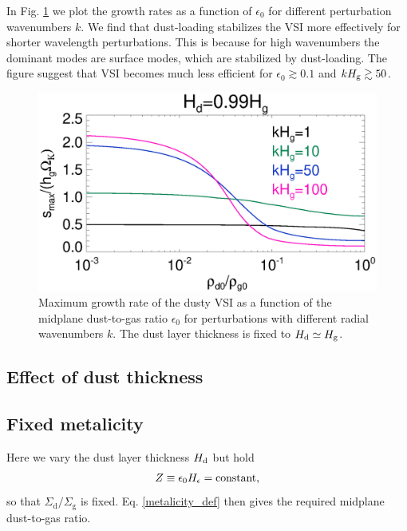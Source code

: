 In Fig. \ref{vsi_dust_loading_vareps} we plot the growth rates as a
function of $\epsilon_0$ for different perturbation wavenumbers $k$. We
find that dust-loading stabilizes the VSI more effectively for shorter
wavelength perturbations. This is because for high wavenumbers the
dominant modes are surface modes, which are stabilized by
dust-loading. The figure suggest that VSI becomes much less efficient
for $\epsilon_0\gtrsim 0.1$ and $kH_\mathrm{g}\gtrsim 50$. 

\begin{figure}
  \includegraphics[width=\linewidth]{figures/compare_eigenvals_vareps} 
  \caption{Maximum growth rate of the dusty VSI as a function of the
    midplane dust-to-gas ratio $\epsilon_0$ for perturbations with
    different radial wavenumbers $k$. The dust layer thickness is
    fixed to $H_\mathrm{d}\simeq H_\mathrm{g}$. 
    \label{vsi_dust_loading_vareps}
    }
\end{figure}

\subsection{Effect of dust thickness}



\subsection{Fixed metalicity} 
Here we vary the dust layer thickness $H_\mathrm{d}$ but hold 
\begin{align}\label{metalicity_def}
Z \equiv \epsilon_0 H_\epsilon = \text{constant,}
\end{align}
so that $\Sigma_\mathrm{d}/\Sigma_\mathrm{g}$ is
fixed. Eq. \ref{metalicity_def} then gives the required midplane
dust-to-gas ratio. 

